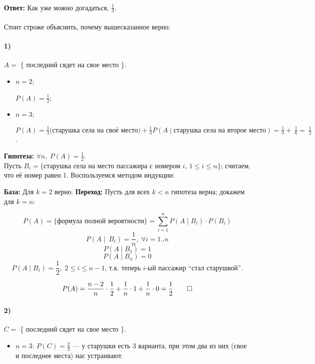 ~\ 

\noindent\textbf{Ответ:} Как уже можно догадаться, $\frac{1}{3}$.

\paragraph{} Стоит строже объяснить, почему вышесказанное верно:

\paragraph{1)} 
$A = $ \{ последний сядет на свое место \}.
\begin{itemize}
    \item $n = 2$;\par $P(A) = \frac{1}{2}$;
    \item $n = 3$;\par $P(A) = \frac{1}{3} \text{(старушка села на своё место)} + \frac{1}{3}P(A\mid \text{старушка села на второе место}) = \frac{1}{3} +~\frac{1}{6} =~ \frac{1}{2}$.
\end{itemize}

    \textbf{Гипотеза:} $\forall n,\; P(A) = \frac{1}{2}$. \\ 
    Пусть $B_i = \{\text{старушка села на место пассажира с номером $i$, $1 \leqslant i \leqslant n$}\}$; считаем, что её номер равен 1. Воспользуемся методом индукции:

    \textbf{База:} Для $k=2$ верно.
    \textbf{Переход:} Пусть для всех $k < n$ гипотеза верна; докажем для $k = n$:

    \[
    P(A) = \{\text{формула полной вероятности}\} = \sum\limits_{i=1}^n P(A\mid B_i) \cdot P(B_i) 
    \]
	\[P(A\mid\ B_i) = \frac{1}{n},\; \forall i = 1..n\]
    \[P(A\mid B_1) = 1\]
    \[P(A\mid B_n) = 0\]
    \[P(A\mid B_i) = \frac{1}{2}, \; 2\leqslant i\leqslant n-1 \text{, т.к. теперь $i$-ый пассажир ``стал старушкой''.}\]

    \[P(A) = \frac{n-2}{n}\cdot \frac{1}{2} + \frac{1}{n}\cdot 1 + \frac{1}{n}\cdot 0 = \frac{1}{2} \qed\]

\paragraph{2)}
    $C = $ \{ последний сядет на свое место \}.
\begin{itemize}
    \item $n=3$: $P(C) = \frac{2}{3}$ --- у старушки есть $3$ варианта, при этом два из них (свое и последнее места) нас устраивают.
\end{itemize}

